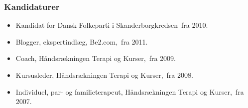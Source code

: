 \documentclass[11pt, a4paper]{awesome-cv}
\begin{document}
\begin{cvletter}
\subsubsection*{Kandidaturer}
\begin{itemize}
\item Kandidat for Dansk Folkeparti i Skanderborgkredsen fra 2010.
\end{itemize}
\begin{itemize}
\item Blogger, ekspertindlæg, Be2.com, fra 2011.
\item Coach, Håndsrækningen Terapi og Kurser, fra 2009.
\item Kursusleder, Håndsrækningen Terapi og Kurser, fra 2008.
\item Individuel, par- og familieterapeut, Håndsrækningen Terapi og Kurser, fra 2007.
\end{itemize}
\end{cvletter}
\end{document}
